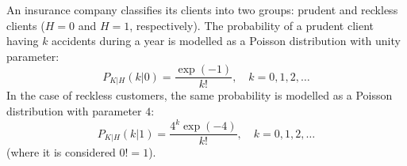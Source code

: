  \begin{solution}
\end{solution}

\else

\question	An insurance company classifies its clients into two groups: prudent and reckless clients ($H=0$ and $H =1$, respectively). The probability of a prudent client having $k$ accidents during a year is modelled as a Poisson distribution with unity parameter:
$$P_{K|H}(k|0)=\frac{\exp(-1)}{k !}, \quad k=0,1,2,\ldots$$
In the case of reckless customers, the same probability is modelled as a Poisson distribution with parameter $4$:
$$P_{K|H}(k|1)=\frac{4^k\exp(-4)}{k !}, \quad k=0,1,2,\ldots$$
(where it is considered $0! = 1$).

